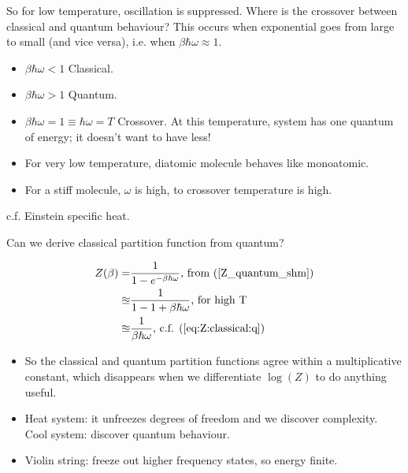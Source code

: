 \documentclass[]{article}
\begin{document}
So for low temperature, oscillation is suppressed.	Where is the crossover between classical and quantum behaviour? This occurs when exponential goes from large to small (and vice versa), i.e. when $\beta\hbar \omega \approx 1$.

\begin{itemize}
	\item $\beta\hbar \omega < 1$ Classical.
	\item $\beta\hbar \omega > 1$ Quantum.
	\item $\beta\hbar \omega = 1\equiv\hbar \omega=T$ Crossover. At this temperature, system has one quantum of energy; it doesn't want to have less!
	\item For very low temperature, diatomic molecule behaves like monoatomic.
	\item For a stiff molecule, $\omega$ is high, to crossover temperature is high.
\end{itemize}

c.f. Einstein specific heat.

Can we derive classical partition function from quantum?

\begin{align*}
Z(\beta) =&  \frac{1}{1 - e^{- \beta\hbar \omega}} \text{, from (\ref {Z_quantum_shm})}\\
\approxeq & \frac{1}{1 - 1 + \beta\hbar \omega}\text{, for high T}\\
\approxeq & \frac{1}{\beta\hbar \omega}\text{, c.f. (\ref{eq:Z:classical:q})}
\end{align*}

\begin{itemize}
	\item So the classical and quantum partition functions agree within a multiplicative constant, which disappears when we differentiate $\log(Z)$ to do anything useful.
	\item Heat system: it unfreezes degrees of freedom and we discover complexity. Cool system: discover quantum behaviour.
	\item Violin string: freeze out higher frequency states, so energy finite.
\end{itemize}
\end{document}
